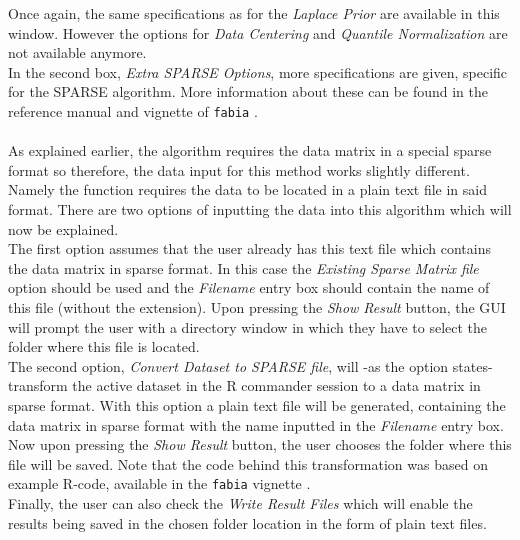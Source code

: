 \documentclass[a4paper]{article}\usepackage[]{graphicx}\usepackage[]{color}
\begin{document}
\noindent Once again, the same specifications as for the {\it Laplace Prior} are
available in this window. However the options for {\it Data Centering} and {\it
Quantile Normalization} are not available anymore.\\
In the second box, {\it Extra SPARSE Options}, more specifications are given,
specific for the SPARSE algorithm. More information about these can be found in
the reference manual and vignette of \verb|fabia| \citep{Hochreiter2014}.
\\ \\
As explained earlier, the algorithm requires the data matrix in a special sparse
format so therefore, the data input for this method works slightly different.
Namely the function requires the data to be located in a plain text file in said
format. There are two options of inputting the data into this algorithm which
will now be explained.\\
The first option assumes that the user already has this text file which contains
the data matrix in sparse format. In this case the {\it Existing Sparse Matrix file}
option should be used and the {\it Filename} entry box should contain the name
of this file (without the extension). Upon pressing the {\it Show Result}
button, the GUI will prompt the user with a directory window in which they have to
select the folder where this file is located.\\
The second option, {\it Convert Dataset to SPARSE file}, will -as the option
states- transform the active dataset in the R commander session to a data matrix
in sparse format. With this option a plain text file will be generated,
containing the data matrix in sparse format with the name inputted in the {\it
Filename} entry box. Now upon pressing the {\it Show Result} button, the user
chooses the folder where this file will be saved. Note that the code behind this
transformation was based on example R-code, available in the \verb|fabia|
vignette \citep{Hochreiter2014a}.\\
Finally, the user can also check the {\it Write Result Files} which will enable
the results being saved in the chosen folder location in the form of plain text
files.
\end{document}
